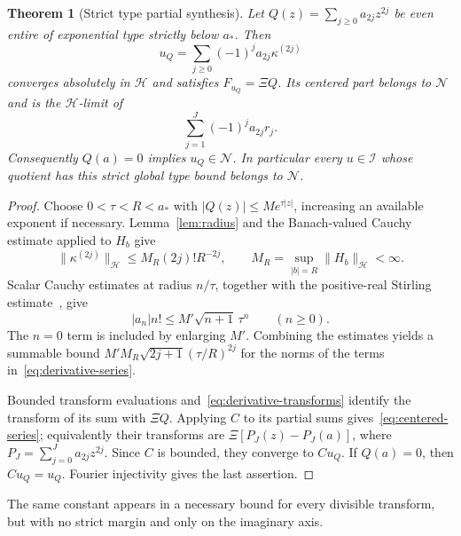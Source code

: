\documentclass[11pt,a4paper]{article}
\numberwithin{equation}{section}
\newtheorem{theorem}{Theorem}[section]
\theoremstyle{definition}
\theoremstyle{remark}
\newcommand{\Hh}{\mathcal H}
\newcommand{\Nn}{\mathcal N}
\newcommand{\Ii}{\mathcal I}
\newcommand{\norm}[1]{\lVert #1\rVert}
\begin{document}
\begin{theorem}[Strict type partial synthesis]\label{thm:type}
Let $Q(z)=\sum_{j\ge0}a_{2j}z^{2j}$ be even entire of exponential type strictly below $a_*$. Then
\begin{equation}\label{eq:derivative-series}
 u_Q=\sum_{j\ge0}(-1)^j a_{2j}\kappa^{(2j)}
\end{equation}
converges absolutely in $\Hh$ and satisfies $F_{u_Q}=\Xi Q$. Its centered part belongs to $\Nn$ and is the $\Hh$-limit of
\begin{equation}\label{eq:centered-series}
 \sum_{j=1}^J(-1)^j a_{2j}r_j.
\end{equation}
Consequently $Q(a)=0$ implies $u_Q\in\Nn$. In particular every $u\in\Ii$ whose quotient has this strict global type bound belongs to $\Nn$.
\end{theorem}
\begin{proof}
Choose $0<\tau<R<a_*$ with $|Q(z)|\le M e^{\tau|z|}$, increasing an available exponent if necessary. Lemma~\ref{lem:radius} and the Banach-valued Cauchy estimate applied to $H_b$ give
\begin{equation}\label{eq:Banach-Cauchy}
 \norm{\kappa^{(2j)}}_{\Hh}\le M_R(2j)!R^{-2j},\qquad
 M_R=\sup_{|b|=R}\norm{H_b}_{\Hh}<\infty.
\end{equation}
Scalar Cauchy estimates at radius $n/\tau$, together with the positive-real Stirling estimate~\cite[\S5.11]{DLMFgamma}, give
\begin{equation}\label{eq:scalar-Cauchy}
 |a_n|n!\le M'\sqrt{n+1}\,\tau^n\qquad(n\ge0).
\end{equation}
The $n=0$ term is included by enlarging $M'$. Combining the estimates yields a summable bound
$M'M_R\sqrt{2j+1}(\tau/R)^{2j}$ for the norms of the terms in~\eqref{eq:derivative-series}.

Bounded transform evaluations and~\eqref{eq:derivative-transforms} identify the transform of its sum with $\Xi Q$. Applying $C$ to its partial sums gives~\eqref{eq:centered-series}; equivalently their transforms are
$\Xi[P_J(z)-P_J(a)]$, where $P_J=\sum_{j=0}^J a_{2j}z^{2j}$. Since $C$ is bounded, they converge to $Cu_Q$. If $Q(a)=0$, then $Cu_Q=u_Q$. Fourier injectivity gives the last assertion.
\end{proof}

The same constant appears in a necessary bound for every divisible transform, but with no strict margin and only on the imaginary axis.
\end{document}
